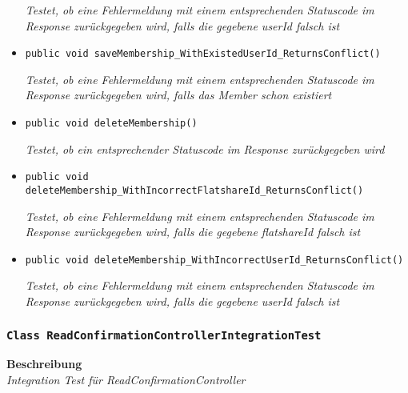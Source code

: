 \begin{itemize}
 	\textit{Testet, ob eine Fehlermeldung mit einem entsprechenden Statuscode im Response zurückgegeben wird, falls die gegebene userId falsch ist}
 	
 	\item{\texttt{public void saveMembership\_WithExistedUserId\_ReturnsConflict()}}
 	
 	\textit{Testet, ob eine Fehlermeldung mit einem entsprechenden Statuscode im Response zurückgegeben wird, falls das Member schon existiert}
 	
 	\item{\texttt{public void deleteMembership()}}
 	
 	\textit{Testet, ob ein entsprechender Statuscode im Response zurückgegeben wird}
 	
 	\item{\texttt{public void deleteMembership\_WithIncorrectFlatshareId\_ReturnsConflict()}}
 	
 	\textit{Testet, ob eine Fehlermeldung mit einem entsprechenden Statuscode im Response zurückgegeben wird, falls die gegebene flatshareId falsch ist}
 	
 	\item{\texttt{public void deleteMembership\_WithIncorrectUserId\_ReturnsConflict()}}
 	
 	\textit{Testet, ob eine Fehlermeldung mit einem entsprechenden Statuscode im Response zurückgegeben wird, falls die gegebene userId falsch ist}
 \end{itemize}
 
 \subsubsection{\texttt{Class ReadConfirmationControllerIntegrationTest}}
 \textbf{Beschreibung} \\
 \textit{Integration Test für ReadConfirmationController}
